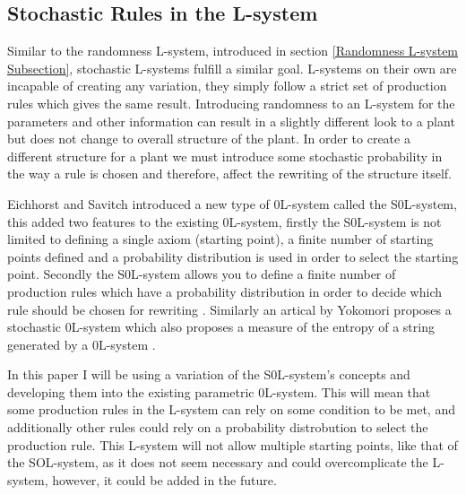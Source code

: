 \subsection{Stochastic Rules in the L-system} \label{Stochastic L-system Subsection}

\begin{flushleft}

Similar to the randomness L-system, introduced in section \ref{Randomness L-system Subsection}, stochastic L-systems fulfill a similar goal. L-systems on their own are incapable of creating any variation, they simply follow a strict set of production rules which gives the same result. Introducing randomness to an L-system for the parameters and other information can result in a slightly different look to a plant but does not change to overall structure of the plant. In order to create a different structure for a plant we must introduce some stochastic probability in the way a rule is chosen and therefore, affect the rewriting of the structure itself. \\

\vspace{5mm}

Eichhorst and Savitch introduced a new type of 0L-system called the S0L-system, this added two features to the existing 0L-system, firstly the S0L-system is not limited to defining a single axiom (starting point), a finite number of starting points defined and a probability distribution is used in order to select the starting point. Secondly the S0L-system allows you to define a finite number of production rules which have a probability distribution in order to decide which rule should be chosen for rewriting \cite{eichhorst1980growth}. Similarly an artical by Yokomori proposes a stochastic 0L-system which also proposes a measure of the entropy of a string generated by a 0L-system \cite{yokomori1980stochastic}. \\

\vspace{5mm}

In this paper I will be using a variation of the S0L-system's concepts and developing them into the existing parametric 0L-system. This will mean that some production rules in the L-system can rely on some condition to be met, and additionally other rules could rely on a probability distrobution to select the production rule. This L-system will not allow multiple starting points, like that of the SOL-system, as it does not seem necessary and could overcomplicate the L-system, however, it could be added in the future.


\end{flushleft}

